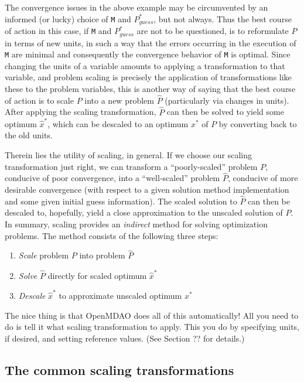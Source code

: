 \documentclass{article}
\begin{document}
The convergence issues in the above example may be circumvented by an informed (or lucky) choice of \texttt{M} and $P_{guess}^*$, but not always. Thus the best course of action in this case, if \texttt{M} and $P_{guess}^*$ are not to be questioned, is to reformulate $P$ in terms of new units, in such a way that the errors occurring in the execution of \texttt{M} are minimal and consequently the convergence behavior of \texttt{M} is optimal. Since changing the units of a variable amounts to applying a transformation to that variable, and problem scaling is precisely the application of transformations like these to the problem variables, this is another way of saying that the best course of action is to scale $P$ into a new problem $\hat{P}$ (particularly via changes in units). After applying the scaling transformation, $\hat{P}$ can then be solved to yield some optimum $\hat{x}^*$, which can be descaled to an optimum $x^*$ of $P$ by converting back to the old units.

Therein lies the utility of scaling, in general. If we choose our scaling transformation just right, we can transform a ``poorly-scaled'' problem $P$, conducive of poor convergence, into a ``well-scaled'' problem $\hat{P}$, conducive of more desirable convergence (with respect to a given solution method implementation and some given initial guess information). The scaled solution to $\hat{P}$ can then be descaled to, hopefully, yield a close approximation to the unscaled solution of $P$.
\\

\noindent
In summary, scaling provides an \textit{indirect} method for solving optimization problems. The method consists of the following three steps:
\begin{enumerate}
    \item \textit{Scale} problem $P$ into problem $\hat{P}$
    \item \textit{Solve} $\hat{P}$ directly for scaled optimum $\hat{x}^*$
    \item \textit{Descale} $\hat{x}^*$ to approximate unscaled optimum $x^*$
\end{enumerate}

\noindent
The nice thing is that OpenMDAO does all of this automatically! All you need to do is tell it what scaling transformation to apply. This you do by specifying units, if desired, and setting reference values. (See Section ?? for details.)

\subsection*{The common scaling transformations}
\end{document}
